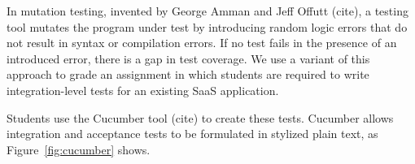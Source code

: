 In mutation testing, invented by George Amman and Jeff Offutt (cite), a
testing tool mutates the program under test by introducing random logic
errors that do not result in syntax or compilation errors.  If no test fails
in the presence of an introduced error, there is a gap in test
coverage.  We use a variant of this approach to grade an
assignment in which students are required to write integration-level
tests for an existing SaaS application.

Students use the Cucumber tool (cite) to create these tests.
Cucumber allows integration and acceptance tests to be formulated in
stylized plain text, as Figure~\ref{fig:cucumber} shows.






